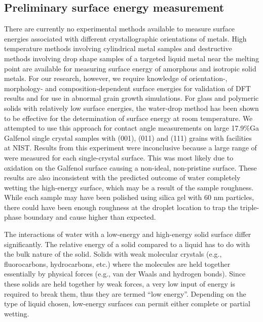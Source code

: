 \subsection{Preliminary surface energy measurement}
There are currently no experimental methods available to measure surface energies associated with different crystallographic orientations of metals. High temperature methods involving cylindrical metal samples and destructive methods involving drop shape samples of a targeted liquid metal near the melting point are available for measuring surface energy of amorphous and isotropic solid metals.\cite{Egry2010,Aqra2011,Cao2011} For our research, however, we require knowledge of orientation-, morphology- and composition-dependent surface energies for validation of DFT results and for use in abnormal grain growth simulations. For glass and polymeric solids with relatively low surface energies, the water-drop method has been shown to be effective for the determination of surface energy at room temperature.\cite{Ahadian2010,Kwok2000,Tavana2005} We attempted to use this approach for contact angle measurements on large 17.9$\%$Ga Galfenol single crystal samples with \hkl(001), \hkl(011) and \hkl(111) grains with facilities at NIST. Results from this experiment were inconclusive because a large range of \ca[s] were measured for each single-crystal surface. This was most likely due to oxidation on the Galfenol surface causing a non-ideal, non-pristine surface. These results are also inconsistent with the predicted outcome of water completely wetting the high-energy surface, which may be a result of the sample roughness. While each sample may have been polished using silica gel with 60 nm particles,\cite{Costa2016} there could have been enough roughness at the droplet location to trap the triple-phase boundary and cause higher \ca[s] than expected. 




The interactions of water with a low-energy and high-energy solid surface differ significantly. The relative energy of a solid compared to a liquid has to do with the bulk nature of the solid. Solids with weak molecular crystals (e.g., fluorocarbons, hydrocarbons, etc.) where the molecules are held together essentially by physical forces (e.g., van der Waals and hydrogen bonds). Since these solids are held together by weak forces, a very low input of energy is required to break them, thus they are termed “low energy”. Depending on the type of liquid chosen, low-energy surfaces can permit either complete or partial wetting. 

